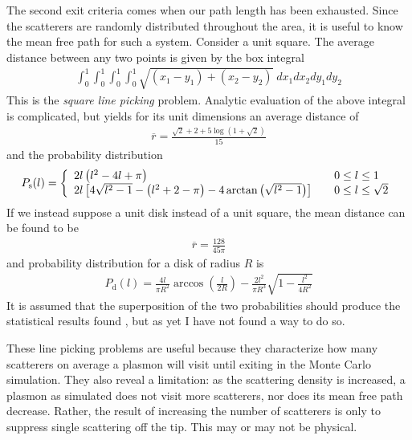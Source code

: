 The second exit criteria comes when our path length has been exhausted.
Since the scatterers are randomly distributed throughout the area, it is
useful to know the mean free path for such a system.  Consider a unit
square.  The average distance between any two points is given by the box
integral
\begin{align}
\int_0^1 \int_0^1 \int_0^1 \int_0^1 \sqrt{(x_1-y_1)+(x_2-y_2)}\; dx_1 dx_2 dy_1 dy_2
\end{align}
This is the \textit{square line picking} problem.  Analytic evaluation of the
above integral is complicated, but yields for its unit dimensions an
average distance of
\begin{align}
\overline{r} = \frac{\sqrt{2}+2+5\log\left(1+\sqrt{2}\right)}{15}
\end{align}
and the probability distribution
\begin{align}
P_\mathrm{s}(l) = \left\{
\begin{array}{l l}
2l\left(l^2 -4l + \pi\right) & \quad  0\leq l \leq 1\\
2l\left[4\sqrt{l^2-1}-\left(l^2+2-\pi\right)-4\arctan\left({\sqrt{l^2-1}}\right)\right]
& \quad 0 \leq l \leq \sqrt{2}\\
\end{array}
\right.
\end{align}
If we instead suppose a unit disk instead of a unit square, the mean
distance can be found to be
\begin{align}
\overline{r}= \frac{128}{45 \pi}
\end{align}
and probability distribution for a disk of radius $R$ is
\begin{align}
P_\mathrm{d}(l)=\frac{4l}{\pi R^2} \arccos\left(\frac{l}{2R}\right) - \frac{2
l^2}{\pi R^3} \sqrt{1-\frac{l^2}{4 R^2}}
\end{align}
It is assumed that the superposition of the two probabilities should
produce the statistical results found , but as yet
I have not found a way to do so.

These line picking problems are useful because they characterize how many
scatterers on average a plasmon will visit until exiting in the Monte Carlo
simulation.  They also reveal a limitation: as the scattering density is
increased, a plasmon as simulated does not visit more scatterers, nor does
its mean free path decrease.  Rather, the result of increasing the number
of scatterers is only to suppress single scattering off the tip.  This may
or may not be physical.
